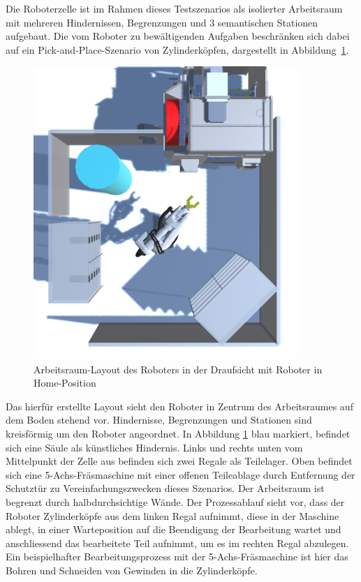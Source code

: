 Die Roboterzelle ist im Rahmen dieses Testszenarios als isolierter Arbeitsraum
mit mehreren Hindernissen, Begrenzungen und 3 semantischen Stationen aufgebaut.
Die vom Roboter zu bewältigenden Aufgaben beschränken sich dabei auf ein
Pick-and-Place-Szenario von Zylinderköpfen, dargestellt in
Abbildung~\ref{figure:arbeitsraum}.

\begin{figure}[H]
  \centering
  \includegraphics[width=10cm]{Figures/Roboterzelle.png}
  \caption{Arbeitsraum-Layout des Roboters in der Draufsicht mit Roboter in
  Home-Position}
  \label{figure:arbeitsraum}
\end{figure}

Das hierfür erstellte Layout sieht den Roboter in Zentrum des Arbeitsraumes auf
dem Boden stehend vor. Hindernisse, Begrenzungen und Stationen sind kreisförmig
um den Roboter angeordnet. In Abbildung
\ref{figure:arbeitsraum}
blau markiert, befindet sich eine Säule als künstliches Hindernis.
Links und rechts unten vom Mittelpunkt der Zelle aus befinden sich
zwei Regale als Teilelager. Oben befindet sich eine 5-Achs-Fräsmaschine mit
einer offenen Teileablage durch Entfernung der Schutztür zu
Vereinfachungszwecken dieses Szenarios. Der Arbeitsraum ist begrenzt durch
halbdurchsichtige Wände. Der Prozessablauf sieht vor, dass der Roboter
Zylinderköpfe aus dem linken Regal aufnimmt, diese in der Maschine ablegt, in
einer Warteposition auf die Beendigung der Bearbeitung wartet und anschliessend
das bearbeitete Teil aufnimmt, um es im rechten Regal abzulegen. Ein
beispielhafter Bearbeitungsprozess mit der 5-Achs-Fräsmaschine ist
hier das Bohren und Schneiden von Gewinden
in die Zylinderköpfe.

